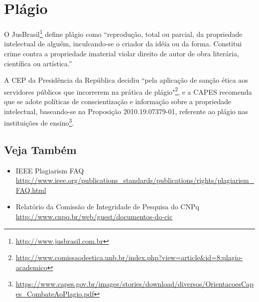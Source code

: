 \section{Plágio}%
O JusBrasil\footnote{\url{http://www.jusbrasil.com.br}} define plágio como
``reprodução, total ou parcial, da propriedade intelectual de alguém, inculcando-se
o criador da idéia ou da forma. Constitui crime contra a propriedade imaterial
violar direito de autor de obra literária, científica ou artística.''


A \acrfull{CEP} da Presidência da República decidiu  ``pela
aplicação de sanção ética aos servidores públicos que incorrerem na prática de
plágio"\footnote{\url{http://www.comissaodeetica.unb.br/index.php?view=article&id=8:plagio-academico}},
e a \acrfull{CAPES} recomenda que se adote políticas de conscientização e informação
sobre a propriedade intelectual, baseando-se na Proposição 2010.19.07379-01,
referente ao plágio nas instituições de ensino\footnote{\url{https://www.capes.gov.br/images/stories/download/diversos/OrientacoesCapes_CombateAoPlagio.pdf}}.


\subsection{Veja Também}
\begin{itemize}
	\item IEEE Plagiarism FAQ
		\\\url{http://www.ieee.org/publications_standards/publications/rights/plagiarism_FAQ.html}
	\item Relatório da Comissão de Integridade de Pesquisa do CNPq
		\\\url{http://www.cnpq.br/web/guest/documentos-do-cic}
\end{itemize}




